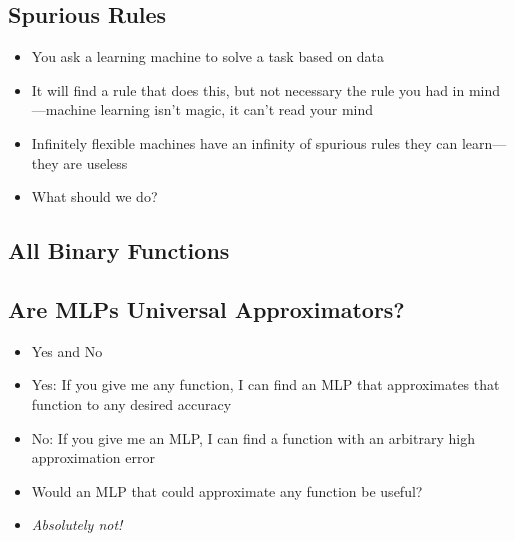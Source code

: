 \begin{slide}
\section{Spurious Rules}

\begin{PauseHighLight}
  \begin{itemize}
  \item You ask a learning machine to solve a task based on data\pause
  \item It will find a rule that does this, but not necessary the rule
    you had in mind\pause---machine learning isn't magic, it can't
    read your mind\pauseb
  \item Infinitely flexible machines have an infinity of spurious
    rules they can learn\pause---they are useless\pauseb
  \item What should we do?\pause
  \end{itemize}
\end{PauseHighLight}

\end{slide}


\begin{slide}
\section[-2]{All Binary Functions}

\pb \pause {}
\begin{center}
  \pause
\end{center}
\end{slide}


\begin{slide}
\section{Are MLPs Universal Approximators?}

\begin{PauseHighLight}
  \begin{itemize}
  \item Yes\pauseb{} and No\pauseb
  \item Yes: If you give me any function, I can find an MLP that
    approximates that function to any desired accuracy\pauseb
  \item No: If you give me an MLP, I can find a function with an
    arbitrary high approximation error\pauseb
  \item Would an MLP that could approximate any function be
    useful?\pauseb
  \item \emph{Absolutely not!}\pauseb
  \end{itemize}
\end{PauseHighLight}

\end{slide}



